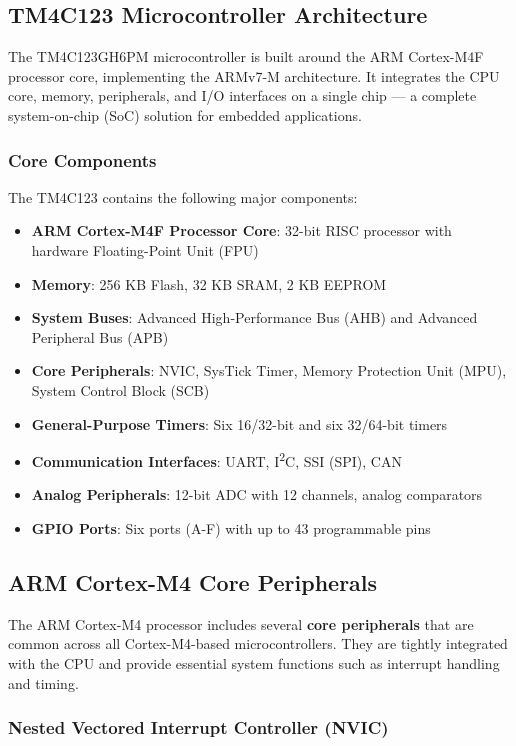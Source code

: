 \subsection{TM4C123 Microcontroller Architecture}

The TM4C123GH6PM microcontroller is built around the ARM Cortex-M4F processor core, implementing the ARMv7-M architecture. It integrates the CPU core, memory, peripherals, and I/O interfaces on a single chip — a complete system-on-chip (SoC) solution for embedded applications.

\subsubsection{Core Components}

The TM4C123 contains the following major components:
\begin{itemize}[nosep]
  \item \textbf{ARM Cortex-M4F Processor Core}: 32-bit RISC processor with hardware Floating-Point Unit (FPU)
  \item \textbf{Memory}: 256 KB Flash, 32 KB SRAM, 2 KB EEPROM
  \item \textbf{System Buses}: Advanced High-Performance Bus (AHB) and Advanced Peripheral Bus (APB)
  \item \textbf{Core Peripherals}: NVIC, SysTick Timer, Memory Protection Unit (MPU), System Control Block (SCB)
  \item \textbf{General-Purpose Timers}: Six 16/32-bit and six 32/64-bit timers
  \item \textbf{Communication Interfaces}: UART, I\textsuperscript{2}C, SSI (SPI), CAN
  \item \textbf{Analog Peripherals}: 12-bit ADC with 12 channels, analog comparators
  \item \textbf{GPIO Ports}: Six ports (A-F) with up to 43 programmable pins
\end{itemize}

\subsection{ARM Cortex-M4 Core Peripherals}

The ARM Cortex-M4 processor includes several \textbf{core peripherals} that are common across all Cortex-M4-based microcontrollers.  
They are tightly integrated with the CPU and provide essential system functions such as interrupt handling and timing.

\subsubsection{Nested Vectored Interrupt Controller (NVIC)}

